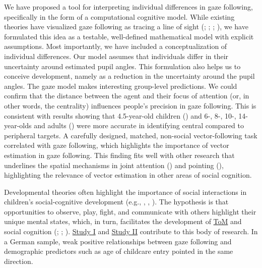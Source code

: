 \documentclass[
]{scrbook}
\begin{document}
We have proposed a tool for interpreting individual differences in gaze following, specifically in the form of a computational cognitive model. While existing theories have visualized gaze following as tracing a line of sight (; ; ; ), we have formulated this idea as a testable, well-defined mathematical model with explicit assumptions. Most importantly, we have included a conceptualization of individual differences. Our model assumes that individuals differ in their uncertainty around estimated pupil angles. This formulation also helps us to conceive development, namely as a reduction in the uncertainty around the pupil angles. The gaze model makes interesting group-level predictions. We could confirm that the distance between the agent and their focus of attention (or, in other words, the centrality) influences people's precision in gaze following. This is consistent with results showing that 4.5-year-old children () and 6-, 8-, 10-, 14-year-olds and adults () were more accurate in identifying central compared to peripheral targets. A carefully designed, matched, non-social vector-following task correlated with gaze following, which highlights the importance of vector estimation in gaze following. This finding fits well with other research that underlines the spatial mechanisms in joint attention () and pointing (), highlighting the relevance of vector estimation in other areas of social cognition.

Developmental theories often highlight the importance of social interactions in children's social-cognitive development (e.g., , , ). The hypothesis is that opportunities to observe, play, fight, and communicate with others highlight their unique mental states, which, in turn, facilitates the development of \hyperref[acronyms_ToM]{ToM} and social cognition (; ; ). \hyperref[studyI]{Study I} and \hyperref[studyII]{Study II} contribute to this body of research. In a German sample, weak positive relationships between gaze following and demographic predictors such as age of childcare entry pointed in the same direction.
\end{document}
